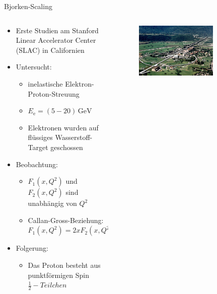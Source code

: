 \documentclass[aspectratio=1610, 9pt]{beamer}
\begin{document}
\begin{frame}{Bjorken-Scaling}
  \begin{columns}
    \begin{column}{0.4\textwidth}
      \begin{itemize}
        \item{Erste Studien am Stanford Linear Accelerator Center (SLAC) in Californien}
        \item{Untersucht:}
        \begin{itemize}
          \item {inelastische Elektron-Proton-Streuung}
          \item {$E_\text{e} = (5 - 20) \,\mathrm{GeV} $}
          \item {Elektronen wurden auf flüssiges Wasserstoff-Target geschossen}
        \end{itemize}
        \item{Beobachtung:}
        \begin{itemize}
          \item {$F_1(x, Q^2)$ und $F_2(x, Q^2)$ sind unabhängig von $Q^2$}
          \item {Callan-Gross-Beziehung: $F_1(x, Q^2) = 2x F_2(x, Q^2)$}
        \end{itemize}
        \item{Folgerung:}
        \begin{itemize}
          \item {Das Proton besteht aus punktförmigen Spin $\frac{1}{2}-Teilchen $ }
        \end{itemize}
      \end{itemize}
    \end{column}
    \begin{column}{0.6\textwidth}
      \begin{figure}
        \centering
        \includegraphics[width=0.75\textwidth]{images/ariel2.jpg}
      \end{figure}
    \end{column}
  \end{columns}

\end{frame}
\end{document}

